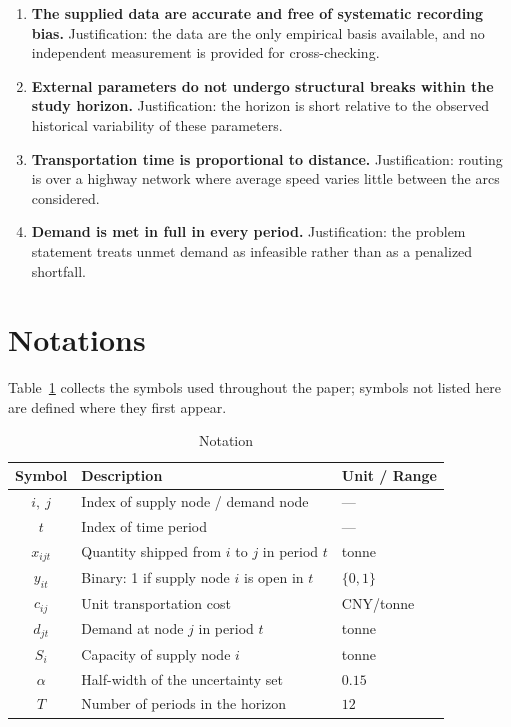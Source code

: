 \documentclass[12pt]{article}
\begin{document}
\begin{enumerate}
  \item \textbf{The supplied data are accurate and free of systematic recording bias.}
        Justification: the data are the only empirical basis available, and no
        independent measurement is provided for cross-checking.
  \item \textbf{External parameters do not undergo structural breaks within the study
        horizon.} Justification: the horizon is short relative to the observed
        historical variability of these parameters.
  \item \textbf{Transportation time is proportional to distance.} Justification:
        routing is over a highway network where average speed varies little between
        the arcs considered.
  \item \textbf{Demand is met in full in every period.} Justification: the problem
        statement treats unmet demand as infeasible rather than as a penalized
        shortfall.
\end{enumerate}

\section{Notations}
\label{sec:notation}

Table~\ref{tab:notation} collects the symbols used throughout the paper; symbols not
listed here are defined where they first appear.

\begin{table}[htbp]
  \centering
  \caption{Notation}
  \label{tab:notation}
  \begin{tabular}{cll}
    \toprule
    \textbf{Symbol} & \textbf{Description} & \textbf{Unit / Range} \\
    \midrule
    $i,\ j$          & Index of supply node / demand node          & --- \\
    $t$              & Index of time period                        & --- \\
    $x_{ijt}$        & Quantity shipped from $i$ to $j$ in period $t$ & tonne \\
    $y_{it}$         & Binary: 1 if supply node $i$ is open in $t$ & $\{0,1\}$ \\
    $c_{ij}$         & Unit transportation cost                    & CNY/tonne \\
    $d_{jt}$         & Demand at node $j$ in period $t$            & tonne \\
    $S_i$            & Capacity of supply node $i$                 & tonne \\
    $\alpha$         & Half-width of the uncertainty set           & $0.15$ \\
    $T$              & Number of periods in the horizon            & $12$ \\
    \bottomrule
  \end{tabular}
\end{table}
\end{document}
